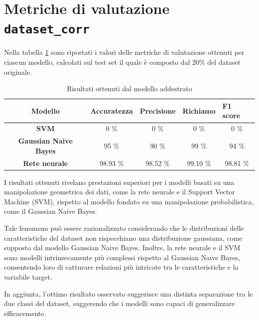 \section{Metriche di valutazione \texttt{dataset\_corr}} \label{sec:metriche}
Nella tabella \ref{tab:risultati} sono riportati i valori delle metriche di
valutazione ottenuti per ciascun modello, calcolati sul test set il quale è
composto dal $20\%$ del dataset originale.
\begin{table}[!ht]
    \centering
    \begin{tabular}{@{}cllll@{}}
        \toprule
        \rowcolor[HTML]{EFEFEF}
        \textbf{Modello}                                      & \textbf{Accuratezza}         & \textbf{Precisione}          & \textbf{Richiamo}            & \textbf{F1 score}            \\ \midrule
        \cellcolor[HTML]{EFEFEF}\textbf{SVM}                  & \multicolumn{1}{c}{0 \%}     & \multicolumn{1}{c}{0 \%}     & \multicolumn{1}{c}{0 \%}     & \multicolumn{1}{c}{0 \%}     \\
        \cellcolor[HTML]{EFEFEF}\textbf{Gaussian Naive Bayes} & \multicolumn{1}{c}{95 \%}    & \multicolumn{1}{c}{90 \%}    & \multicolumn{1}{c}{99 \%}    & \multicolumn{1}{c}{94 \%}    \\
        \cellcolor[HTML]{EFEFEF}\textbf{Rete neurale}         & \multicolumn{1}{c}{98.93 \%} & \multicolumn{1}{c}{98.52 \%} & \multicolumn{1}{c}{99.10 \%} & \multicolumn{1}{c}{98.81 \%} \\ \bottomrule
    \end{tabular}
    \caption{Risultati ottenuti dal modello addestrato}
    \label{tab:risultati}
\end{table}

I risultati ottenuti rivelano prestazioni superiori per i modelli basati su una
manipolazione geometrica dei dati, come la rete neurale e il Support Vector
Machine (SVM), rispetto al modello fondato su una manipolazione probabilistica,
come il Gaussian Naive Bayes.

Tale fenomeno può essere razionalizzato considerando che le distribuzioni delle
caratteristiche del dataset non rispecchiano una distribuzione gaussiana, come
supposto dal modello Gaussian Naive Bayes. Inoltre, la rete neurale e il SVM
sono modelli intrinsecamente più complessi rispetto al Gaussian Naive Bayes,
consentendo loro di catturare relazioni più intricate tra le caratteristiche e
la variabile target.

In aggiunta, l'ottimo risultato osservato suggerisce una distinta separazione tra le
due classi del dataset, suggerendo che i modelli sono capaci di generalizzare
efficacemente.

